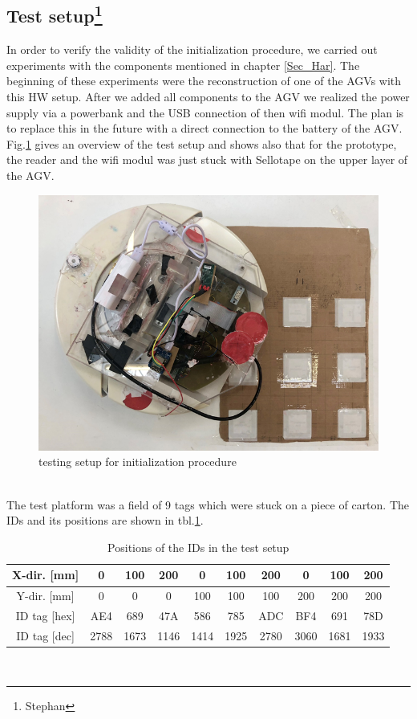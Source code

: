 \subsection[Test setup]{Test setup\footnote{Stephan}}
In order to verify the validity of the initialization procedure, we carried out experiments with the components mentioned in chapter \ref{Sec_Har}. The beginning of these experiments were the reconstruction of one of the AGVs with this HW setup. After we added all components to the AGV we realized the power supply via a powerbank and the USB connection of then wifi modul. The plan is to replace this in the future with a direct connection to the battery of the AGV. Fig.\ref{TestSetup} gives an overview of the test setup and shows also that for the prototype, the reader and the wifi modul was just stuck with Sellotape on the upper layer of the AGV.\\
\begin{figure}[!htbp]
\centering
\includegraphics[width = 14cm]{Pictures/TestSetup}
\caption{testing setup for initialization procedure}
\label{TestSetup}
\end{figure}\\
The test platform was a field of 9 tags which were stuck on a piece of carton. The IDs and its positions are shown in tbl.\ref{IDs_Setup}.\\
\begin{table}[!htbp]
\begin{tabular}{|c|c|c|c|c|c|c|c|c|c|}
\hline
X-dir. [mm] & 0    & 100  & 200  & 0    & 100  & 200  & 0    & 100  & 200  \\ \hline
Y-dir. [mm] & 0    & 0    & 0    & 100  & 100  & 100  & 200  & 200  & 200  \\ \hline
ID tag [hex]    & AE4  & 689  & 47A  & 586  & 785  & ADC  & BF4  & 691  & 78D  \\ \hline
ID tag [dec]    & 2788 & 1673 & 1146 & 1414 & 1925 & 2780 & 3060 & 1681 & 1933 \\ \hline
\end{tabular}
\caption{Positions of the IDs in the test setup}
\label{IDs_Setup}
\end{table}\\
